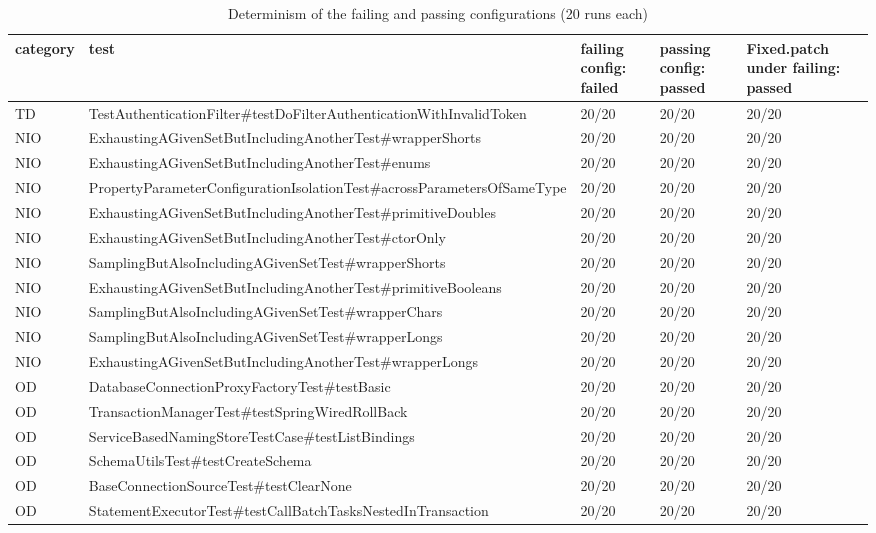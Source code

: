 \begin{table}[t]
\centering\small
\caption{Determinism of the failing and passing configurations (20 runs each)}
\label{tab:config_validation}
\begin{tabular}{lllll}
\toprule
\textbf{category} & \textbf{test} & \textbf{failing config: failed} & \textbf{passing config: passed} & \textbf{Fixed.patch under failing: passed} \\
\midrule
TD & TestAuthenticationFilter\#testDoFilterAuthenticationWithInvalidToken & 20/20 & 20/20 & 20/20 \\
NIO & ExhaustingAGivenSetButIncludingAnotherTest\#wrapperShorts & 20/20 & 20/20 & 20/20 \\
NIO & ExhaustingAGivenSetButIncludingAnotherTest\#enums & 20/20 & 20/20 & 20/20 \\
NIO & PropertyParameterConfigurationIsolationTest\#acrossParametersOfSameType & 20/20 & 20/20 & 20/20 \\
NIO & ExhaustingAGivenSetButIncludingAnotherTest\#primitiveDoubles & 20/20 & 20/20 & 20/20 \\
NIO & ExhaustingAGivenSetButIncludingAnotherTest\#ctorOnly & 20/20 & 20/20 & 20/20 \\
NIO & SamplingButAlsoIncludingAGivenSetTest\#wrapperShorts & 20/20 & 20/20 & 20/20 \\
NIO & ExhaustingAGivenSetButIncludingAnotherTest\#primitiveBooleans & 20/20 & 20/20 & 20/20 \\
NIO & SamplingButAlsoIncludingAGivenSetTest\#wrapperChars & 20/20 & 20/20 & 20/20 \\
NIO & SamplingButAlsoIncludingAGivenSetTest\#wrapperLongs & 20/20 & 20/20 & 20/20 \\
NIO & ExhaustingAGivenSetButIncludingAnotherTest\#wrapperLongs & 20/20 & 20/20 & 20/20 \\
OD & DatabaseConnectionProxyFactoryTest\#testBasic & 20/20 & 20/20 & 20/20 \\
OD & TransactionManagerTest\#testSpringWiredRollBack & 20/20 & 20/20 & 20/20 \\
OD & ServiceBasedNamingStoreTestCase\#testListBindings & 20/20 & 20/20 & 20/20 \\
OD & SchemaUtilsTest\#testCreateSchema & 20/20 & 20/20 & 20/20 \\
OD & BaseConnectionSourceTest\#testClearNone & 20/20 & 20/20 & 20/20 \\
OD & StatementExecutorTest\#testCallBatchTasksNestedInTransaction & 20/20 & 20/20 & 20/20 \\

\end{tabular}
\end{table}
